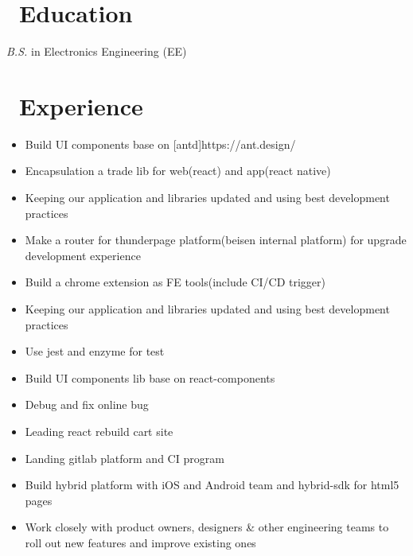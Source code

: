 \documentclass{resume}
\begin{document}



\section{\faGraduationCap\ Education}
\textit{B.S.} in Electronics Engineering (EE)

\section{\faUsers\ Experience}
\role{Senior Developer}
\begin{itemize}
  \item Build UI components base on [antd]{https://ant.design/}
  \item Encapsulation a trade lib for web(react) and app(react native)
  \item Keeping our application and libraries updated and using best development practices
\end{itemize}

\begin{itemize}
  \item Make a router for thunderpage platform(beisen internal platform) for upgrade development experience
  \item Build a chrome extension as FE tools(include CI/CD trigger)
\end{itemize}

\begin{itemize}
  \item Keeping our application and libraries updated and using best development practices
  \item Use jest and enzyme for test
  \item Build UI components lib base on react-components
\end{itemize}

\begin{itemize}
  \item Debug and fix online bug
  \item Leading react rebuild cart site
  \item Landing gitlab platform and CI program
  \item Build hybrid platform with iOS and Android team and hybrid-sdk for html5 pages 
  \item Work closely with product owners, designers & other engineering teams to roll out new features and improve existing ones
\end{itemize}
\end{document}
